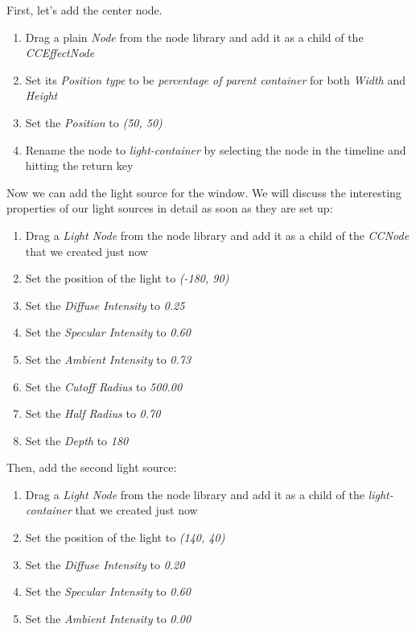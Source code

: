 \begin{leftbar}
First, let's add the center node.
\begin{enumerate}
  \item Drag a plain \textit{Node} from the node library and add it as a child
  of the \textit{CCEffectNode}
  \item Set its \textit{Position type} to be \textit{percentage of parent
  container} for both \textit{Width} and \textit{Height}
  \item Set the \textit{Position} to \textit{(50, 50)}
  \item Rename the node to \textit{light-container} by selecting the node in the
  timeline and hitting the return key
\end{enumerate}
Now we can add the light source for the window. We will discuss the interesting
properties of our light sources in detail as soon as they are set up:
\begin{enumerate}
  \item Drag a \textit{Light Node} from the node library and add it as a child
  of the \textit{CCNode} that we created just now
  \item Set the position of the light to \textit{(-180, 90)}
  \item Set the \textit{Diffuse Intensity} to \textit{0.25}
  \item Set the \textit{Specular Intensity} to \textit{0.60}
  \item Set the \textit{Ambient Intensity} to \textit{0.73}
  \item Set the \textit{Cutoff Radius} to \textit{500.00}
  \item Set the \textit{Half Radius} to \textit{0.70}
  \item Set the \textit{Depth} to \textit{180}
\end{enumerate}
Then, add the second light source:
\begin{enumerate}
  \item Drag a \textit{Light Node} from the node library and add it as a child
  of the \textit{light-container} that we created just now
  \item Set the position of the light to \textit{(140, 40)}
  \item Set the \textit{Diffuse Intensity} to \textit{0.20}
  \item Set the \textit{Specular Intensity} to \textit{0.60}
  \item Set the \textit{Ambient Intensity} to \textit{0.00}
\end{enumerate}
\end{leftbar}

